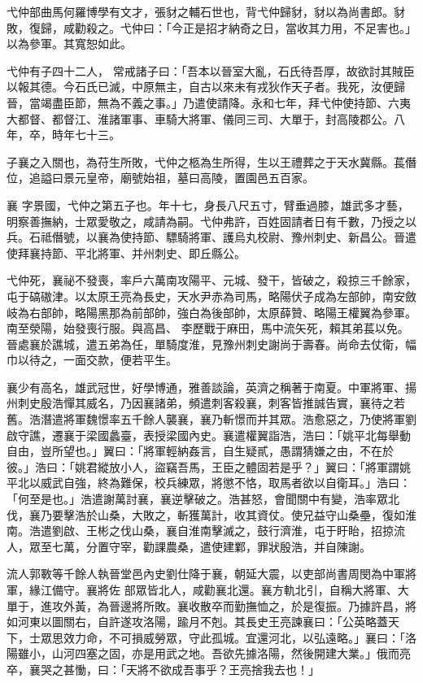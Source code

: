 \begin{pinyinscope}
 弋仲部曲馬何羅博學有文才，張豺之輔石世也，背弋仲歸豺，豺以為尚書郎。豺敗，復歸，咸勸殺之。弋仲曰：「今正是招才納奇之日，當收其力用，不足害也。」以為參軍。其寬恕如此。



 弋仲有子四十二人，
 常戒諸子曰：「吾本以晉室大亂，石氏待吾厚，故欲討其賊臣以報其德。今石氏已滅，中原無主，自古以來未有戎狄作天子者。我死，汝便歸晉，當竭盡臣節，無為不義之事。」乃遣使請降。永和七年，拜弋仲使持節、六夷大都督、都督江、淮諸軍事、車騎大將軍、儀同三司、大單于，封高陵郡公。八年，卒，時年七十三。



 子襄之入關也，為苻生所敗，弋仲之柩為生所得，生以王禮葬之于天水冀縣。萇僭位，追謚曰景元皇帝，廟號始祖，墓曰高陵，置園邑五百家。



 襄
 字景國，弋仲之第五子也。年十七，身長八尺五寸，臂垂過膝，雄武多才藝，明察善撫納，士眾愛敬之，咸請為嗣。弋仲弗許，百姓固請者日有千數，乃授之以兵。石祗僭號，以襄為使持節、驃騎將軍、護烏丸校尉、豫州刺史、新昌公。晉遣使拜襄持節、平北將軍、并州刺史、即丘縣公。



 弋仲死，襄祕不發喪，率戶六萬南攻陽平、元城、發干，皆破之，殺掠三千餘家，屯于碻磝津。以太原王亮為長史，天水尹赤為司馬，略陽伏子成為左部帥，南安斂岐為右部帥，略陽黑那為前部帥，強白為後部帥，太原薛贊、略陽王權翼為參軍。南至滎陽，始發喪行服。與高昌、
 李歷戰于麻田，馬中流矢死，賴其弟萇以免。晉處襄於譙城，遣五弟為任，單騎度淮，見豫州刺史謝尚于壽春。尚命去仗衛，幅巾以待之，一面交款，便若平生。



 襄少有高名，雄武冠世，好學博通，雅善談論，英濟之稱著于南夏。中軍將軍、揚州刺史殷浩憚其威名，乃因襄諸弟，頻遣刺客殺襄，刺客皆推誠告實，襄待之若舊。浩潛遣將軍魏憬率五千餘人襲襄，襄乃斬憬而并其眾。浩愈惡之，乃使將軍劉啟守譙，遷襄于梁國蠡臺，表授梁國內史。襄遣權翼詣浩，浩曰：「姚平北每舉動自由，豈所望也。」翼曰：「將軍輕納姦言，自生疑貳，愚謂猜嫌之由，不在於
 彼。」浩曰：「姚君縱放小人，盜竊吾馬，王臣之體固若是乎？」翼曰：「將軍謂姚平北以威武自強，終為難保，校兵練眾，將懲不恪，取馬者欲以自衛耳。」浩曰：「何至是也。」浩遣謝萬討襄，襄逆擊破之。浩甚怒，會聞關中有變，浩率眾北伐，襄乃要擊浩於山桑，大敗之，斬獲萬計，收其資仗。使兄益守山桑壘，復如淮南。浩遣劉啟、王彬之伐山桑，襄自淮南擊滅之，鼓行濟淮，屯于盱眙，招掠流人，眾至七萬，分置守宰，勸課農桑，遣使建鄴，罪狀殷浩，并自陳謝。



 流人郭斁等千餘人執晉堂邑內史劉仕降于襄，朝延大震，以吏部尚書周閔為中軍將軍，緣江備守。襄將佐
 部眾皆北人，咸勸襄北還。襄方軌北引，自稱大將軍、大單于，進攻外黃，為晉邊將所敗。襄收散卒而勤撫恤之，於是復振。乃據許昌，將如河東以圖關右，自許遂攻洛陽，踰月不剋。其長史王亮諫襄曰：「公英略蓋天下，士眾思效力命，不可損威勞眾，守此孤城。宜還河北，以弘遠略。」襄曰：「洛陽雖小，山河四塞之固，亦是用武之地。吾欲先據洛陽，然後開建大業。」俄而亮卒，襄哭之甚慟，曰：「天將不欲成吾事乎？王亮捨我去也！」




\end{pinyinscope}
